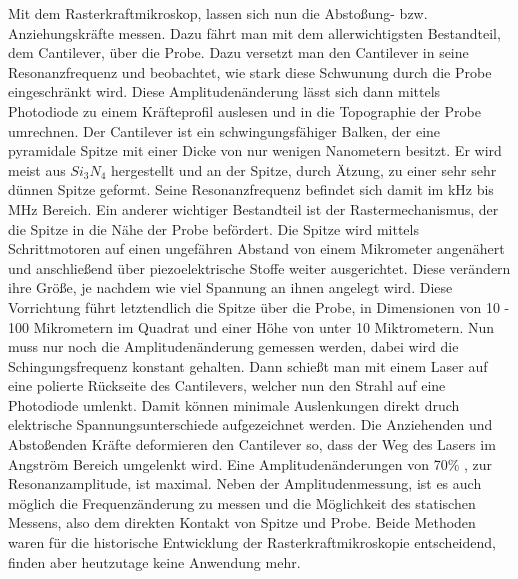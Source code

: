 Mit dem Rasterkraftmikroskop, lassen sich nun die Abstoßung- bzw. Anziehungskräfte messen. Dazu fährt man mit dem allerwichtigsten Bestandteil, dem Cantilever, über die Probe. 
Dazu versetzt man den Cantilever in seine Resonanzfrequenz und beobachtet, wie stark diese Schwunung durch die Probe eingeschränkt wird.
Diese Amplitudenänderung lässt sich dann mittels Photodiode zu einem Kräfteprofil auslesen und in die Topographie der Probe umrechnen.
Der Cantilever ist ein schwingungsfähiger Balken, der eine pyramidale Spitze mit einer Dicke von nur wenigen Nanometern besitzt.
Er wird meist aus $Si_3N_4$ hergestellt und an der Spitze, durch Ätzung, zu einer sehr sehr dünnen Spitze geformt.
Seine Resonanzfrequenz befindet sich damit im kHz bis MHz Bereich.
Ein anderer wichtiger Bestandteil ist der Rastermechanismus, der die Spitze in die Nähe der Probe befördert. Die Spitze wird mittels Schrittmotoren auf einen ungefähren Abstand von einem Mikrometer angenähert und anschließend über piezoelektrische Stoffe weiter ausgerichtet.
Diese verändern ihre Größe, je nachdem wie viel Spannung an ihnen angelegt wird. 
Diese Vorrichtung führt letztendlich die Spitze über die Probe, in Dimensionen von 10 - 100 Mikrometern im Quadrat und einer Höhe von unter 10 Miktrometern.
Nun muss nur noch die Amplitudenänderung gemessen werden, dabei wird die Schingungsfrequenz konstant gehalten. 
Dann schießt man mit einem Laser auf eine polierte Rückseite des Cantilevers, welcher nun den Strahl auf eine Photodiode umlenkt. 
Damit können minimale Auslenkungen direkt druch elektrische Spannungsunterschiede aufgezeichnet werden.
Die Anziehenden und Abstoßenden Kräfte deformieren den Cantilever so, dass der Weg des Lasers im Angström Bereich umgelenkt wird. 
Eine Amplitudenänderungen von 70\% , zur Resonanzamplitude, ist maximal. 
Neben der Amplitudenmessung, ist es auch möglich die Frequenzänderung zu messen und die Möglichkeit des statischen Messens, also dem direkten Kontakt von Spitze und Probe.
Beide Methoden waren für die historische Entwicklung der Rasterkraftmikroskopie entscheidend, finden aber heutzutage keine Anwendung mehr.



